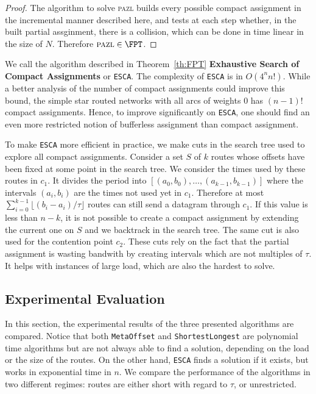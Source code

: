 \documentclass[a4paper,10pt]{article}
\newcommand\shortestlongest{\texttt{ShortestLongest}\xspace}
\newcommand\metaoffset{\texttt{MetaOffset}\xspace}
\newcommand\ESCA{\texttt{ESCA}\xspace}
\newcommand\pazl{\textsc{pazl}\xspace}
\begin{document}
\begin{proof}
The algorithm to solve \pazl builds every possible compact assignment in the incremental manner described here, and tests at each step whether, in the built partial assginment, there is a collision, which can be done in time linear in the size of $N$. Therefore $\pazl \in \FPT$.
\end{proof}


We call the algorithm described in Theorem~\ref{th:FPT} \textbf{Exhaustive Search of Compact Assignments}
or \ESCA. The complexity of \ESCA is in $O(4^n n!)$. While a better analysis
of the number of compact assignments could improve this bound, the simple star routed networks with all arcs of weights $0$ has $(n-1)!$ compact assignments. Hence, to improve significantly on \ESCA, one should find an even more restricted notion of bufferless assignment than compact assignment.

To make \ESCA more efficient in practice, we make cuts in the search tree used to explore all compact assignments. Consider a set $S$ of $k$ routes whose offsets have been fixed at some point in the search tree. We consider the times used by these routes in $c_1$. It divides the period into $[(a_0,b_0), \dots, (a_{k-1},b_{k-1})]$ where the intervals $(a_i,b_i)$ are the times not used yet in $c_1$. Therefore at most $\displaystyle{ \sum_{i=0}^{k-1} \lfloor(b_{i} -a_i)/\tau\rfloor}$ routes can still send a datagram through $c_1$. If this value is less than $n - k$, it is not possible to create a compact assignment by extending the current one on $S$ and we backtrack in the search tree. The same cut is also used for the contention point $c_2$. These cuts rely on the fact that the partial assignment is wasting bandwith by creating intervals which are not multiples of $\tau$. It helps with instances of large load, which are also the hardest to solve.



   \subsection{Experimental Evaluation}\label{sec:exp_PAZL}

   
  In this section, the experimental results of the three presented algorithms are compared.
   Notice that both \metaoffset and \shortestlongest are polynomial time algorithms but are not always able to find a solution, depending on the load or the size of the routes. On the other hand, \ESCA finds a solution if it exists, but works in exponential time in $n$. We compare the performance of the algorithms in two different regimes: routes are either short with regard to $\tau$, or unrestricted.
\end{document}
